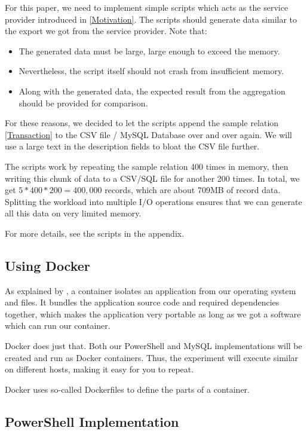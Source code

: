 For this paper, we need to implement simple scripts which acts as the
service provider introduced in \ref{Motivation}. The scripts
should generate data similar to the export we got from
the service provider. Note that:
\begin{itemize}
    \item The generated data must be large, large enough to exceed
        the memory.
    \item Nevertheless, the script itself should not crash from
        insufficient memory.
    \item Along with the generated data, the expected result from the
        aggregation should be provided for comparison.
\end{itemize}
For these reasons, we decided to let the scripts append the
sample relation \ref{Transaction} to the CSV file / MySQL Database
over and over again. We will use a large text in the description
fields to bloat the CSV file further.

The scripts work by repeating the sample relation 400 times in memory,
then writing this chunk of data to a CSV/SQL file for another 200 times.
In total, we get $5*400*200=400,000$ records, which are about 709MB
of record data. Splitting the workload into multiple I/O operations
ensures that we can generate all this data on very limited memory.

For more details, see the scripts in the appendix.

\subsection{Using Docker}

As explained by \cite{docContainer}, a container isolates
an application from our operating system and files.
It bundles the application source code and
required dependencies together, which makes the application
very portable as long as we got a software which can run our container.

Docker does just that. Both our PowerShell and MySQL implementations
will be created and run as Docker containers. Thus,
the experiment will execute similar on different hosts, making
it easy for you to repeat.

Docker uses so-called Dockerfiles to define the parts of a container.

\subsection{PowerShell Implementation}

